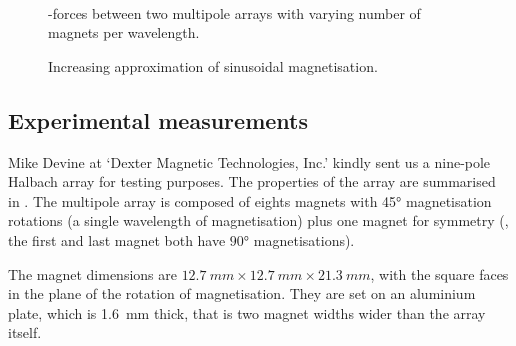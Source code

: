 \begin{figure}
\begin{wide}
  \def\figpath{\phdpath Simulations/Magnet_arrays/French_array/eps-20051109/}
  \hfill
  \\
  \hfill
\end{wide}
  \caption{\z-forces between two multipole arrays with
           varying number of magnets per wavelength.}
\end{figure}

\begin{figure}
   \centering
   \caption{Increasing approximation of sinusoidal magnetisation.}
\end{figure}

\subsection{Experimental measurements}

Mike Devine at `Dexter Magnetic Technologies, Inc.' kindly sent us a
nine-pole Halbach array for testing purposes.  The properties of the
array are summarised in .  The
multipole array is composed of eights magnets with \ang{45}
magnetisation rotations (a single wavelength of magnetisation) plus
one magnet for symmetry (\ie, the first and last magnet both have
$\ang{+90}$ magnetisations).

The magnet dimensions are $\SI{12.7}{mm} \times \SI{12.7}{mm} \times
\SI{21.3}{mm}$, with the square faces in the plane of the rotation of
magnetisation. They are set on an aluminium plate, which is \SI{1.6}{mm}
thick, that is two magnet widths wider than the array itself.

